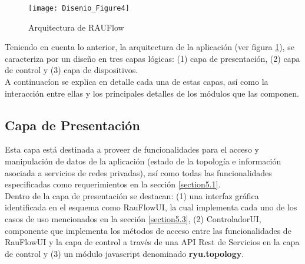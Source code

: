 


\begin{figure}[h] 
\centering    
\texttt{[image: Disenio\_Figure4]}
\caption[Arquitectura de RAUFlow]{Arquitectura de RAUFlow}
\label{fig:VistaComponentes2}
\end{figure}

Teniendo en cuenta lo anterior, la arquitectura de la aplicaci\'on (ver figura \ref{fig:VistaComponentes2}), se caracteriza por un diseño en tres capas l\'ogicas: (1) capa de presentaci\'on, (2) capa de control y (3) capa de dispositivos.\\

A continuac\'ion se explica en detalle cada una de estas capas, as\'i como la interacci\'on entre ellas y los principales detalles de los m\'odulos que las componen.

\subsection{Capa de Presentación}
Esta capa est\'a destinada a proveer de funcionalidades para el acceso y manipulaci\'on de datos de la aplicaci\'on (estado de la topolog\'ia e informaci\'on asociada a servicios de redes privadas), as\'i como todas las funcionalidades especificadas como requerimientos en la secci\'on 
\ref{section5.1}.\\ 

Dentro de la capa de presentaci\'on se destacan: (1) una interfaz gr\'afica identificada en el esquema como RauFlowUI, la cual implementa cada uno de los casos de uso mencionados en la secci\'on \ref{section5.3}, (2) ControladorUI, componente que implementa los m\'etodos de acceso entre las funcionalidades de RauFlowUI y la capa de control a trav\'es de una API Rest de Servicios en la capa de control y (3) un m\'odulo javascript denominado \textbf{ryu.topology}.\\ 

